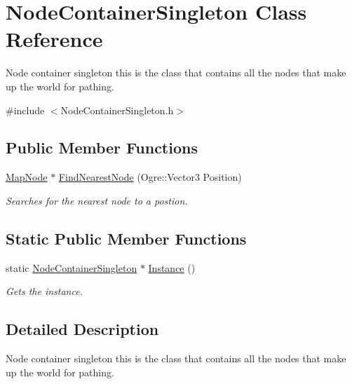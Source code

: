 \hypertarget{class_node_container_singleton}{\section{Node\-Container\-Singleton Class Reference}
\label{class_node_container_singleton}
}


Node container singleton this is the class that contains all the nodes that make up the world for pathing.  




{\ttfamily \#include $<$Node\-Container\-Singleton.\-h$>$}

\subsection*{Public Member Functions}
\begin{DoxyCompactItemize}
\item 
\hyperlink{class_map_node}{Map\-Node} $\ast$ \hyperlink{class_node_container_singleton_a8dc436b2278212ffe2063438f54cd6a9}{Find\-Nearest\-Node} (Ogre\-::\-Vector3 Position)
\begin{DoxyCompactList}\small\item\em Searches for the nearest node to a postion. \end{DoxyCompactList}\end{DoxyCompactItemize}
\subsection*{Static Public Member Functions}
\begin{DoxyCompactItemize}
\item 
static \hyperlink{class_node_container_singleton}{Node\-Container\-Singleton} $\ast$ \hyperlink{class_node_container_singleton_ad9e8f40bc5677d244037299cfc29a7b9}{Instance} ()
\begin{DoxyCompactList}\small\item\em Gets the instance. \end{DoxyCompactList}\end{DoxyCompactItemize}


\subsection{Detailed Description}
Node container singleton this is the class that contains all the nodes that make up the world for pathing. 

